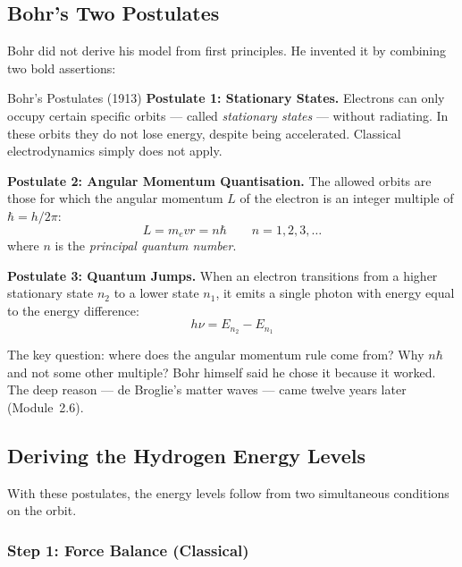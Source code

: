 \documentclass[12pt, a4paper]{book}
\newcommand{\newterm}[1]{\textit{\textcolor{DiscoveryColor}{#1}}}
\begin{document}
\subsection{Bohr's Two Postulates}

Bohr did not derive his model from first principles.
He invented it by combining two bold assertions:

\begin{namedconcept}{Bohr's Postulates (1913)}
\textbf{Postulate 1: Stationary States.}
Electrons can only occupy certain specific orbits ---
called \newterm{stationary states} --- without radiating.
In these orbits they do not lose energy,
despite being accelerated.
Classical electrodynamics simply does not apply.

\vspace{6pt}
\textbf{Postulate 2: Angular Momentum Quantisation.}
The allowed orbits are those for which the angular momentum
$L$ of the electron is an integer multiple of $\hbar = h/2\pi$:
\[
  L = m_e v r = n\hbar \qquad n = 1, 2, 3, \ldots
\]
where $n$ is the \newterm{principal quantum number}.

\vspace{6pt}
\textbf{Postulate 3: Quantum Jumps.}
When an electron transitions from a higher stationary state
$n_2$ to a lower state $n_1$, it emits a single photon
with energy equal to the energy difference:
\[
  h\nu = E_{n_2} - E_{n_1}
\]
\end{namedconcept}

\vspace{0.5em}

The key question: where does the angular momentum rule come from?
Why $n\hbar$ and not some other multiple?
Bohr himself said he chose it because it worked.
The deep reason --- de Broglie's matter waves ---
came twelve years later (Module~2.6).

\subsection{Deriving the Hydrogen Energy Levels}

With these postulates, the energy levels follow from
two simultaneous conditions on the orbit.

\subsubsection{Step 1: Force Balance (Classical)}
\end{document}
